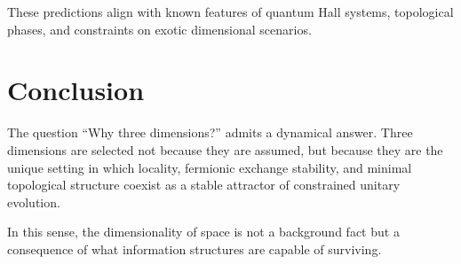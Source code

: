 \documentclass[11pt]{article}
\begin{document}
These predictions align with known features of quantum Hall systems, topological phases, and constraints on exotic dimensional scenarios.

\section{Conclusion}

The question ``Why three dimensions?'' admits a dynamical answer. Three dimensions are selected not because they are assumed, but because they are the unique setting in which locality, fermionic exchange stability, and minimal topological structure coexist as a stable attractor of constrained unitary evolution.

In this sense, the dimensionality of space is not a background fact but a consequence of what information structures are capable of surviving.
\end{document}
